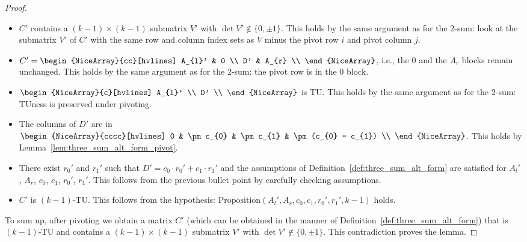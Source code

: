 \begin{proof}
    \begin{itemize}
        \item $C'$ contains a $(k - 1) \times (k - 1)$ submatrix $V'$ with $\det V' \notin \{0, \pm 1\}$. This holds by the same argument as for the $2$-sum: look at the submatrix $V'$ of $C'$ with the same row and column index sets as $V$ minus the pivot row $i$ and pivot column $j$.
        \item $C' = \begin{NiceArray}{cc}[hvlines] A_{l}' & 0 \\ D' & A_{r} \\ \end{NiceArray}$, i.e., the $0$ and the $A_{r}$ blocks remain unchanged. This holds by the same argument as for the $2$-sum: the pivot row is in the $0$ block.
        \item $\begin{NiceArray}{c}[hvlines] A_{l}' \\ D' \\ \end{NiceArray}$ is TU. This holds by the same argument as for the $2$-sum: TUness is preserved under pivoting.
        \item The columns of $D'$ are in $\begin{NiceArray}{cccc}[hvlines] 0 & \pm c_{0} & \pm c_{1} & \pm (c_{0} - c_{1}) \\ \end{NiceArray}$. This holds by Lemma~\ref{lem:three_sum_alt_form_pivot}.
        \item There exist $r_{0}'$ and $r_{1}'$ such that $D' = c_{0} \cdot r_{0}' + c_{1} \cdot r_{1}'$ and the assumptions of Definition~\ref{def:three_sum_alt_form} are satisfied for $A_{l}'$, $A_{r}$, $c_{0}$, $c_{1}$, $r_{0}'$, $r_{1}'$. This follows from the previous bullet point by carefully checking assumptions.
        \item $C'$ is $(k - 1)$-TU. This follows from the hypothesis: $\mathrm{Proposition}(A_{l}', A_{r}, c_{0}, c_{1}, r_{0}', r_{1}', k - 1)$ holds.
    \end{itemize}

    To sum up, after pivoting we obtain a matrix $C'$ (which can be obtained in the manner of Definition~\ref{def:three_sum_alt_form}) that is $(k - 1)$-TU and contains a $(k - 1) \times (k - 1)$ submatrix $V'$ with $\det V' \notin \{0, \pm 1\}$. This contradiction proves the lemma.
\end{proof}

